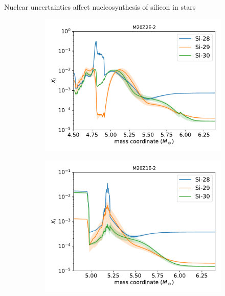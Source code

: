 \documentclass[10pt]{beamer}
\begin{document}
\begin{frame}{Nuclear uncertainties affect nucleosynthesis of silicon in stars}
\begin{figure}
        \begin{subfigure}[b]{0.42\textwidth}
            \includegraphics[width=\textwidth]{figs/M20Z2E-2_mcresult.pdf}
        \end{subfigure}
        \begin{subfigure}[b]{0.42\textwidth}
            \includegraphics[width=\textwidth]{figs/M20Z1E-2_mcresult.pdf}
        \end{subfigure}
    \end{figure}
\end{frame}
\end{document}
